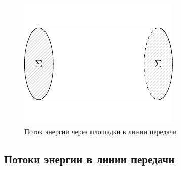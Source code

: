 \begin{figure}[H]
	\centering
	\includegraphics[scale=1.5]{img/lect3_ris11}
	\caption{Поток энергии через площадки в линии передачи}
	\label{fig:lect3:11}
\end{figure}

\subsection{Потоки энергии в линии передачи}